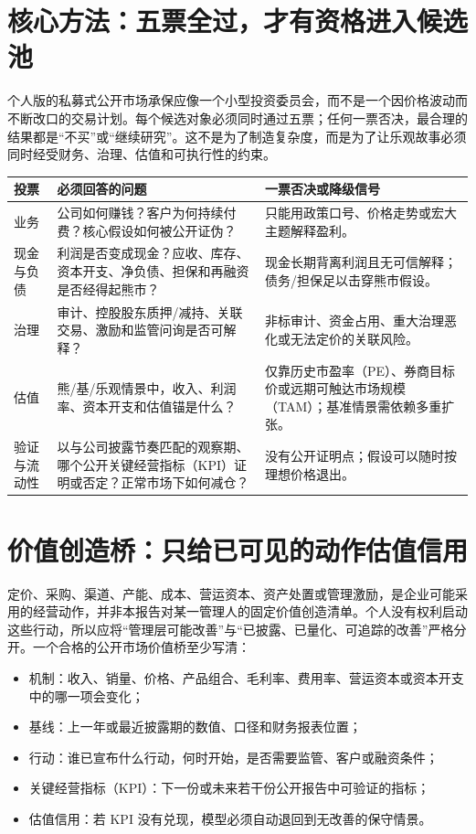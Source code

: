 \section{核心方法：五票全过，才有资格进入候选池}

个人版的私募式公开市场承保应像一个小型投资委员会，而不是一个因价格波动而不断改口的交易计划。每个候选对象必须同时通过五票；任何一票否决，最合理的结果都是“不买”或“继续研究”。这不是为了制造复杂度，而是为了让乐观故事必须同时经受财务、治理、估值和可执行性的约束。

\begin{exhibitbox}
\small
\begin{tabularx}{\exhibitboxwidth}{L{2.1cm} X L{3.55cm}}
\toprule
\textbf{投票} & \textbf{必须回答的问题} & \textbf{一票否决或降级信号} \\
\midrule
业务 & 公司如何赚钱？客户为何持续付费？核心假设如何被公开证伪？ & 只能用政策口号、价格走势或宏大主题解释盈利。 \\
现金与负债 & 利润是否变成现金？应收、库存、资本开支、净负债、担保和再融资是否经得起熊市？ & 现金长期背离利润且无可信解释；债务/担保足以击穿熊市假设。 \\
治理 & 审计、控股股东质押/减持、关联交易、激励和监管问询是否可解释？ & 非标审计、资金占用、重大治理恶化或无法定价的关联风险。 \\
估值 & 熊/基/乐观情景中，收入、利润率、资本开支和估值锚是什么？ & 仅靠历史市盈率（PE）、券商目标价或远期可触达市场规模（TAM）；基准情景需依赖多重扩张。 \\
验证与流动性 & 以与公司披露节奏匹配的观察期、哪个公开关键经营指标（KPI）证明或否定？正常市场下如何减仓？ & 没有公开证明点；假设可以随时按理想价格退出。 \\
\bottomrule
\end{tabularx}
\end{exhibitbox}

\section{价值创造桥：只给已可见的动作估值信用}

定价、采购、渠道、产能、成本、营运资本、资产处置或管理激励，是企业可能采用的经营动作，并非本报告对某一管理人的固定价值创造清单。个人没有权利启动这些行动，所以应将“管理层可能改善”与“已披露、已量化、可追踪的改善”严格分开。一个合格的公开市场价值桥至少写清：

\begin{itemize}
  \item 机制：收入、销量、价格、产品组合、毛利率、费用率、营运资本或资本开支中的哪一项会变化；
  \item 基线：上一年或最近披露期的数值、口径和财务报表位置；
  \item 行动：谁已宣布什么行动，何时开始，是否需要监管、客户或融资条件；
  \item 关键经营指标（KPI）：下一份或未来若干份公开报告中可验证的指标；
  \item 估值信用：若 KPI 没有兑现，模型必须自动退回到无改善的保守情景。
\end{itemize}

